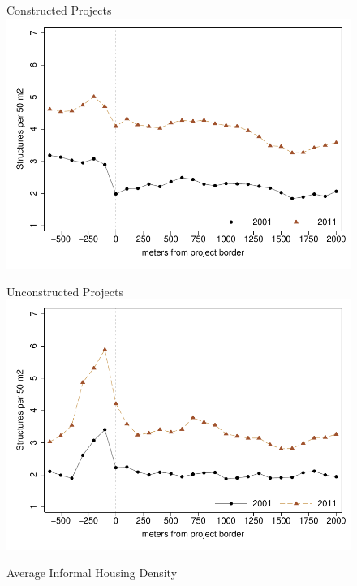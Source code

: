 \documentclass[12pt]{article}
\begin{document}
\begin{figure}
\caption{Average Informal Housing Density}\label{figure:informalmeans}
\centering
\begin{minipage}[b]{.4\textwidth}
\centering
\hspace{1cm}Constructed Projects
\includegraphics[scale=.5]{figures/bblu_inf_rdp_admin.pdf}
\end{minipage}
\begin{minipage}[b]{.4\textwidth}
\centering
\hspace{1cm}Unconstructed Projects
\includegraphics[scale=.5]{figures/bblu_inf_placebo_admin.pdf}
\end{minipage}
\end{figure}
\end{document}
